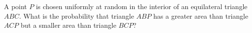 A point $P$ is chosen uniformly at random in the interior of an equilateral triangle $ABC$. What is the probability that triangle $ABP$ has a greater area than triangle $ACP$ but a smaller area than triangle $BCP$?
